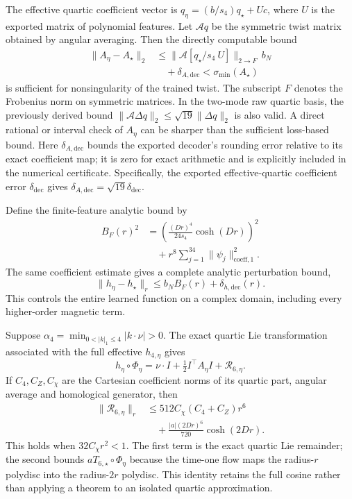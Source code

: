 The effective quartic coefficient vector is
$q_\eta=(b/s_4) q_\star+Uc$, where $U$ is the exported matrix of polynomial
features. Let $\mathcal A q$ be the symmetric twist matrix obtained by
angular averaging. Then the directly computable bound
\begin{equation}
 \begin{aligned}
 \|A_\eta-A_\star\|_2
 &\leq\|\mathcal A[q_\star/s_4\ U]\|_{2\to F}\,b_N\\
 &\quad+\delta_{A,\mathrm{dec}}<\sigma_{\min}(A_\star)
 \end{aligned}
 \label{eq:beam-twist-transfer}
\end{equation}
is sufficient for nonsingularity of the trained twist. The subscript $F$
denotes the Frobenius norm on symmetric matrices. In the two-mode raw
quartic basis, the previously derived bound
$\|\mathcal A\Delta q\|_2\leq\sqrt{19}\|\Delta q\|_2$
is also valid. A direct rational or interval check of $A_\eta$ can be
sharper than the sufficient loss-based bound.
Here $\delta_{A,\mathrm{dec}}$ bounds the exported decoder's rounding
error relative to its exact coefficient map; it is zero for exact
arithmetic and is explicitly included in the numerical certificate.
Specifically, the exported effective-quartic coefficient error
$\delta_{\mathrm{dec}}$ gives
$\delta_{A,\mathrm{dec}}=\sqrt{19}\delta_{\mathrm{dec}}$.

Define the finite-feature analytic bound by
\[
 \begin{aligned}
 B_F(r)^2&=\left(\frac{(Dr)^4}{24s_4}\cosh(Dr)\right)^2\\
 &\quad+r^8\sum_{j=1}^{34}\|\psi_j\|_{\mathrm{coeff},1}^2.
 \end{aligned}
\]
The same coefficient estimate gives a complete analytic perturbation bound,
\begin{equation}
 \|h_\eta-h_\star\|_r\leq b_N B_F(r)+\delta_{h,\mathrm{dec}}(r).
 \label{eq:beam-analytic-transfer}
\end{equation}
This controls the entire learned function on a complex domain, including
every higher-order magnetic term.

Suppose $\alpha_4=\min_{0<|k|_1\leq4}|k\cdot\nu|>0$.
The exact quartic Lie transformation associated with the full effective
$h_{4,\eta}$ gives
\[
 h_\eta\circ\Phi_\eta
 =\nu\cdot I+\tfrac12I^\top A_\eta I+\mathcal R_{6,\eta}.
\]
If $C_4,C_Z,C_\chi$ are the Cartesian coefficient norms of its quartic
part, angular average and homological generator, then
\begin{equation}
 \begin{aligned}
 \|\mathcal R_{6,\eta}\|_r
 &\leq512C_\chi(C_4+C_Z)r^6\\
 &\quad+\frac{|a|(2Dr)^6}{720}\cosh(2Dr).
 \end{aligned}
 \label{eq:beam-complete-normal-form-tail}
\end{equation}
This holds when $32C_\chi r^2<1$.
The first term is the exact quartic Lie remainder; the second bounds
$aT_{6,\star}\circ\Phi_\eta$ because the time-one flow maps the radius-$r$
polydisc into the radius-$2r$ polydisc. This identity retains the full
cosine rather than applying a theorem to an isolated quartic approximation.

